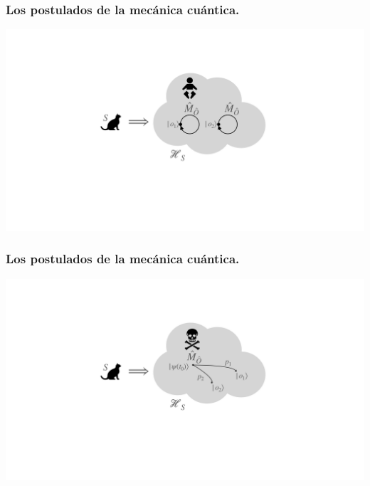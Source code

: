 \documentclass{beamer}
\begin{document}
\begin{frame}
    \frametitle{Los postulados de la mecánica cuántica.}
    \begin{center}
        \includegraphics[scale=0.3]{figs/cats_12.pdf}
    \end{center}

\end{frame}

\begin{frame}
    \frametitle{Los postulados de la mecánica cuántica.}
    \begin{center}
        \includegraphics[scale=0.3]{figs/cats_11.pdf}
    \end{center}

\end{frame}
\end{document}
